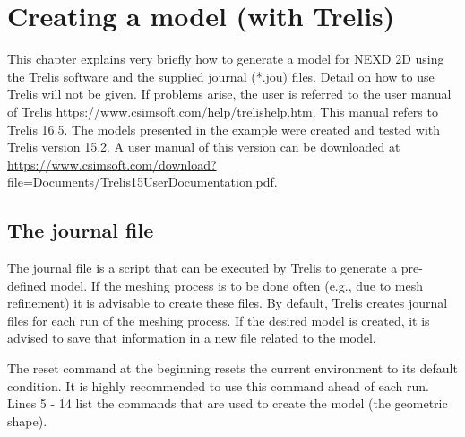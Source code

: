 \chapter{Creating a model (with Trelis)}
\label{chap:model}
	This chapter explains very briefly how to generate a model for NEXD 2D using the Trelis software and the supplied journal (*.jou) files. Detail on how to use Trelis will not be given. If problems arise, the user is referred to the user manual of Trelis \url{https://www.csimsoft.com/help/trelishelp.htm}. This manual refers to Trelis 16.5. The models presented in the example were created and tested with Trelis version 15.2. A user manual of this version can be downloaded at \url{https://www.csimsoft.com/download?file=Documents/Trelis15UserDocumentation.pdf}. 
	\section{The journal file}
	\label{sec:jou}
		The journal file is a script that can be executed by Trelis to generate a pre-defined model. If the meshing process is to be done often (e.g., due to mesh refinement) it is advisable to create these files. By default, Trelis creates journal files for each run of the meshing process. If the desired model is created, it is advised to save that information in a new file related to the model.   
		
		
    
    	The reset command at the beginning resets the current environment to its default condition. It is highly recommended to use this command ahead of each run.
    	Lines 5 - 14 list the commands that are used to create the model (the geometric shape).	

	\medskip
    	
